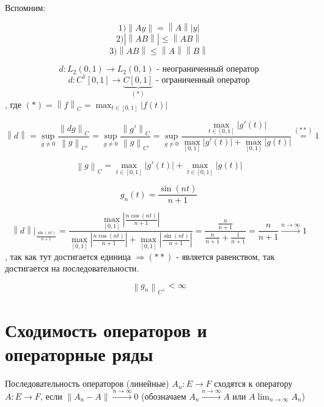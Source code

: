\documentclass[12pt, a4paper]{report}
\begin{document}
\fi


Вспомним: 

\[ 1) \left\lVert  A y \right\rVert = \left\lVert A  \right\rVert \left\lvert y \right\rvert \] 
\[ 2) \left\lvert \left\lVert AB  \right\rVert \right\rvert  \le  \left\lVert AB \right\rVert\] 
\[ 3) \left\lVert AB  \right\rVert \le \left\lVert  A  \right\rVert \left\lVert B \right\rVert \] 


\[ d: L_2 (0,1 ) \to  L_2 (0,1 ) \text{ - неограниченный оператор} \] 
\[ d : C^1 [0,1 ] \to  \underbrace{C [0,1]}_{(*)} \text{ - ограниченный оператор} \] 
, где \((*) = \left\lVert f \right\rVert _C = \max _{t \in  [0,1 ]} \left\lvert f(t) \right\rvert  \)

\[ \left\lVert d  \right\rVert = \sup _{g \neq 0} \frac{ \left\lVert dg  \right\rVert _C}{\left\lVert g  \right\rVert _{C '} } = \sup _{g \neq 0} \frac{ \left\lVert g'  \right\rVert _C}{\left\lVert g \right\rVert _{C '} } = \sup _{g \neq 0} \frac{\displaystyle \max _{t \in [0,1 ]} \left\lvert  g ' (t) \right\rvert}{\displaystyle  \max _{[0,1 ]} \left\lvert g '(t) \right\rvert + \max _{[0,1 ]}  \left\lvert g(t) \right\rvert}    \overset{(**)}{=} 1\] 

\[ \left\lVert g  \right\rVert _C = \max _{t \in  [0,1 ] } \left\lvert g' (t ) \right\rvert + \max _{t \in  [0,1 ]} \left\lvert g(t) \right\rvert   \] 

\[ g_n(t ) = \frac{\sin  (nt )}{n +1}   \]  

\[ \left\lVert d  \right\rVert |_{\frac{\sin (nt)}{n+1} } = \frac{\displaystyle  \max _{[0,1]} \left\lvert \frac{n \cos (nt )}{n+1}  \right\rvert}{\displaystyle  \max _{[0,1]} \left\lvert \frac{n \cos (nt )}{n+1}  \right\rvert + \max _{[0,1]} \left\lvert \frac{\sin (nt)}{n+1}  \right\rvert  } = \frac{\displaystyle  \frac{n}{n+1} }{\displaystyle \frac{n}{n+1 }  +\frac{1}{n+1} }  =\frac{n}{n+1 } \xrightarrow{n \to  \infty } 1     \] 
, так как тут достигается единица \( \Rightarrow (**)\) - является равенством, так достигается на последовательности. 

\[ \left\lVert g_n \right\rVert _{C^{ \perp } } < \infty  \] 

\section{Сходимость операторов и операторные ряды}

\begin{definition}
    Последовательность операторов (линейные) \( A_n : E \to  F \) сходятся к оператору \( A : E \to  F \), если \( \left\lVert A_n -A \right\rVert \xrightarrow{n \to  \infty  } 0    \) (обозначаем \( A_n \xrightarrow{ n \to  \infty } A \text{ или }  A \displaystyle \lim_{n \to  \infty  }A_n    \))
\end{definition}
\end{document}
